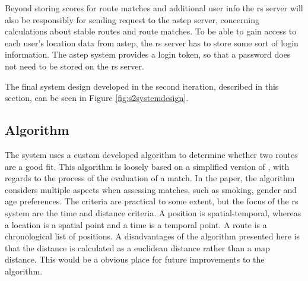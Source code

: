 

Beyond storing scores for route matches and additional user info the \gls{rs} server will also be responsibly for sending request to the \gls{astep} server, concerning calculations about stable routes and route matches.
To be able to gain access to each user's location data from \gls{astep}, the \gls{rs} server has to store some sort of login information.
The \gls{astep} system provides a login token, so that a password does not need to be stored on the \gls{rs} server.


The final system design developed in the second iteration, described in this section, can be seen in Figure \ref{fig:s2systemdesign}.



\subsection{Algorithm}
The system uses a custom developed algorithm to determine whether two routes are a good fit.
This algorithm is loosely based on a simplified version of \citet{ghoseiri2011real}, with regards to the process of the evaluation of a match.
In the paper, the algorithm considers multiple aspects when assessing matches, such as smoking, gender and age preferences.
The criteria are practical to some extent, but the focus of the \gls{rs} system are the time and distance criteria.
A position is spatial-temporal, whereas a location is a spatial point and a time is a temporal point.
A route is a chronological list of positions.
A disadvantages of the algorithm presented here is that the distance is calculated as a euclidean distance rather than a map distance. 
This would be a obvious place for future improvements to the algorithm.


